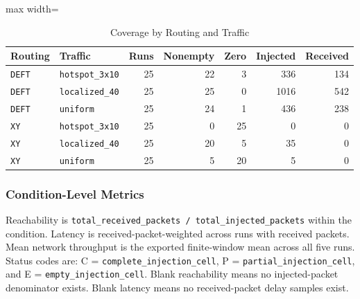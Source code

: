 \documentclass[conference]{IEEEtran}
\begin{document}
\begin{table}[t]
\centering
\caption{Coverage by Routing and Traffic}
\label{tab:coverage}
\begin{adjustbox}{max width=\columnwidth}
\begin{tabular}{@{}llrrrrr@{}}
\toprule
\textbf{Routing} & \textbf{Traffic} & \textbf{Runs} & \textbf{Nonempty} & \textbf{Zero} & \textbf{Injected} & \textbf{Received} \\
\midrule
\texttt{DEFT} & \texttt{hotspot\_3x10} & 25 & 22 & 3 & 336 & 134 \\
\texttt{DEFT} & \texttt{localized\_40} & 25 & 25 & 0 & 1016 & 542 \\
\texttt{DEFT} & \texttt{uniform} & 25 & 24 & 1 & 436 & 238 \\
\texttt{XY} & \texttt{hotspot\_3x10} & 25 & 0 & 25 & 0 & 0 \\
\texttt{XY} & \texttt{localized\_40} & 25 & 20 & 5 & 35 & 0 \\
\texttt{XY} & \texttt{uniform} & 25 & 5 & 20 & 5 & 0 \\
\bottomrule
\end{tabular}
\end{adjustbox}
\end{table}

\subsubsection{Condition-Level Metrics}

Reachability is \texttt{total\_received\_packets / total\_injected\_packets} within the condition. Latency is received-packet-weighted across runs with received packets. Mean network throughput is the exported finite-window mean across all five runs. Status codes are: C = \texttt{complete\_injection\_cell}, P = \texttt{partial\_injection\_cell}, and E = \texttt{empty\_injection\_cell}. Blank reachability means no injected-packet denominator exists. Blank latency means no received-packet delay samples exist.
\end{document}

